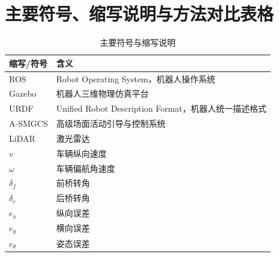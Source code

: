 \chapter{主要符号、缩写说明与方法对比表格}

\begin{table}[H]
\centering
\caption{主要符号与缩写说明}
\label{tab:appendix_symbols}
\footnotesize
\renewcommand{\arraystretch}{1.18}
\begin{tabularx}{\textwidth}{p{}X}
\toprule
缩写/符号 & 含义 \\
\midrule
ROS & Robot Operating System，机器人操作系统 \\
Gazebo & 机器人三维物理仿真平台 \\
URDF & Unified Robot Description Format，机器人统一描述格式 \\
A-SMGCS & 高级场面活动引导与控制系统 \\
LiDAR & 激光雷达 \\
$v$ & 车辆纵向速度 \\
$\omega$ & 车辆偏航角速度 \\
$\delta_f$ & 前桥转角 \\
$\delta_r$ & 后桥转角 \\
$e_x$ & 纵向误差 \\
$e_y$ & 横向误差 \\
$e_\theta$ & 姿态误差 \\
\bottomrule
\end{tabularx}
\end{table}



